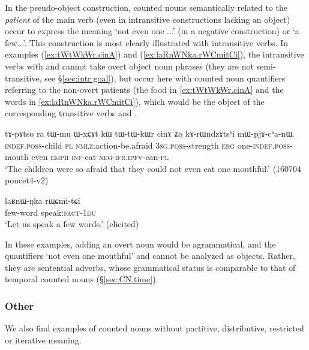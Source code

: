 In the pseudo-object construction, counted nouns semantically related to the \textit{patient} of the main verb (even in intransitive constructions lacking an object) occur to express the meaning `not even one ...' (in a negative construction) or `a few...'. This construction is most clearly illustrated with intransitive verbs. In examples (\ref{ex:tWtWkWr.cinA}) and (\ref{ex:laRnWNka.rWCmitCi}), the intransitive verbs with  and  cannot take overt object noun phrases (they are not semi-transitive, see §\ref{sec:intr.goal}), but occur here with counted noun quantifiers referring to the non-overt patients (the food in \ref{ex:tWtWkWr.cinA} and the words in \ref{ex:laRnWNka.rWCmitCi}), which would be the object of the corresponding transitive verbs  and  .


\begin{exe}
	\ex \label{ex:tWtWkWr.cinA}
	\gll tɤ-pɤtso ra tɯ-mu ɯ-xɕɤt kɯ tɯ-tɯ-kɯr cinɤ ʑo kɤ-rɯndzɤtsʰi mɯ-pjɤ-cʰa-nɯ. \\
	\textsc{indef}.\textsc{poss}-child \textsc{pl} \textsc{nmlz}:action-be.afraid \textsc{3sg}.\textsc{poss}-strength \textsc{erg} one-\textsc{indef}.\textsc{poss}-mouth even \textsc{emph} \textsc{inf}-eat \textsc{neg}-\textsc{ifr}.\textsc{ipfv}-can-\textsc{pl} \\
	\glt `The children were so afraid that they could not even eat one mouthful.' (160704 poucet4-v2)
\end{exe}

\begin{exe}
	\ex \label{ex:laRnWNka.rWCmitCi}
	\gll laʁnɯ-ŋka rɯɕmi-tɕi \\
	few-word speak:\textsc{fact}-\textsc{1du} \\
	\glt `Let us speak a few words.' (elicited)
\end{exe}

In these examples, adding an overt noun would be agrammatical, and the quantifiers  `not even one mouthful' and  cannot be analyzed as objects. Rather, they are sentential adverbs, whose grammatical status is comparable to that of temporal counted nouns (§\ref{sec:CN.time}).


\subsubsection{Other}
We also find examples of counted nouns without partitive, distributive, restricted or iterative meaning.


